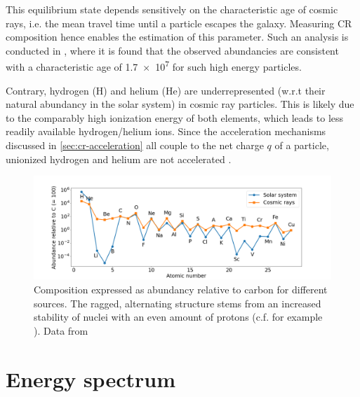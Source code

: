 This equilibrium state depends sensitively on the characteristic age of cosmic rays, i.e. the mean travel time until a particle escapes the galaxy. Measuring CR 
composition hence enables the estimation of this parameter. Such an analysis is conducted in \cite{garcia1977age}, where it is found that the observed abundancies 
are consistent with a characteristic age of \SI{1.7e7}{\year} for such high energy particles.

Contrary, hydrogen (H) and helium (He) are underrepresented (w.r.t their natural abundancy in the solar system) in cosmic ray particles. This is likely due to the 
comparably high ionization energy of both elements, which leads to less readily available hydrogen/helium ions. Since the acceleration mechanisms discussed in 
\autoref{sec:cr-acceleration} all couple to the net charge $q$ of a particle, unionized hydrogen and helium are not accelerated \cite{wang2002measurement}.

\begin{figure}
	\centering
	\includegraphics[width=1\textwidth]{./plots/cosmic_ray_composition.png}
	\caption{Composition expressed as abundancy relative to carbon for different sources. The ragged, alternating structure stems from an increased stability of 
	nuclei with an even amount of protons (c.f. for example \cite{kirson2008mutual}). Data from \cite{gaisser2016cosmic}}
	\label{fig:cr-composition}
\end{figure}

\section{Energy spectrum}
\label{sec:cr-energy-spectrum}

